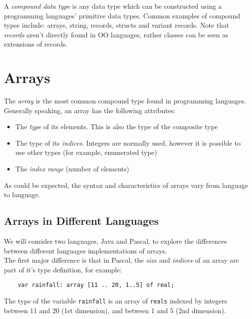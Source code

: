 
A \textit{compound data type} is any data type which can be constructed using a programming languages' primitive data types. Common examples of compound types include: arrays, string, records, structs and variant records. Note that \textit{records} aren't directly found in OO languages, rather classes can be seen as extensions of records.

\section{Arrays}
The \textit{array} is the most common compound type found in programming languages. Generally speaking, an array has the following attributes:
\begin{itemize}
    \item The \textit{type} of its elements. This is also the type of the composite type
    \item The type of its \textit{indices}. Integers are normally used, however it is possible to use other types (for example, enumerated type)
    \item The \textit{index range} (number of elements)
\end{itemize}

As could be expected, the syntax and characteristics of arrays vary from language to language.

\subsection{Arrays in Different Languages}
We will consider two languages, Java and Pascal, to explore the differences between different languages implementations of arrays.\\

The first major difference is that in Pascal, the \textit{size} and \textit{indices} of an array are part of it's type definition, for example:
\begin{verbatim}
    var rainfall: array [11 .. 20, 1..5] of real;
\end{verbatim}
The type of the variable \verb|rainfall| is an array of \verb|reals| indexed by integers between 11 and 20 (1st dimension), and between 1 and 5 (2nd dimension).\\

